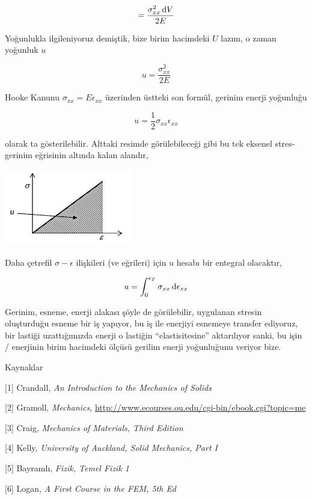 \documentclass[12pt,fleqn]{article}\usepackage{../../common}
\begin{document}
$$
= \frac{\sigma_{xx}^2 \,\mathrm{d} V}{2 E} 
$$

Yoğunlukla ilgileniyoruz demiştik, bize birim hacimdeki $U$ lazım, o zaman
yoğunluk $u$

$$
u = \frac{\sigma_{xx}^2}{2 E}
$$

Hooke Kanunu $\sigma_{xx} = E \epsilon_{xx}$ üzerinden üstteki son formül,
gerinim enerji yoğunluğu

$$
u = \frac{1}{2} \sigma_{xx} \epsilon_{xx}
$$

olarak ta gösterilebilir. Alttaki resimde görülebileceği gibi bu tek eksenel
stres-gerinim eğrisinin altında kalan alandır,

\includegraphics[width=15em]{phy_020_strs_00_09.jpg}

Daha çetrefil $\sigma-\epsilon$ ilişkileri (ve eğrileri) için $u$ hesabı
bir entegral olacaktır,

$$
u = \int_{0}^{\epsilon_{T}} \sigma_{xx} \,\mathrm{d} \epsilon_{xx} 
$$

Gerinim, esneme, enerji alakası şöyle de görülebilir, uygulanan stresin
oluşturduğu esneme bir iş yapıyor, bu iş ile enerjiyi esnemeye transfer
ediyoruz, bir lastiği uzattığımızda enerji o lastiğin ``elastisitesine''
aktarılıyor sanki, bu işin / enerjinin birim hacimdeki ölçüsü gerilim
enerji yoğunluğunu veriyor bize.

Kaynaklar

[1] Crandall, {\em An Introduction to the Mechanics of Solids}

[2] Gramoll, {\em Mechanics},
    \url{http://www.ecourses.ou.edu/cgi-bin/ebook.cgi?topic=me}

[3] Craig, {\em Mechanics of Materials, Third Edition}

[4] Kelly, {\em University of Auckland, Solid Mechanics, Part I}

[5] Bayramlı, {\em Fizik, Temel Fizik 1}

[6] Logan, {\em A First Course in the FEM, 5th Ed}
\end{document}
